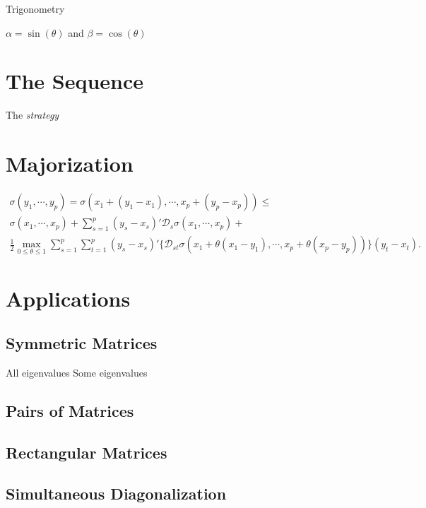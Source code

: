 \documentclass[
  12pt,
]{article}
\begin{document}
Trigonometry

\(\alpha=\sin(\theta)\) and \(\beta=\cos(\theta)\)

\section{The Sequence}\label{the-sequence}

The \emph{strategy}

\section{Majorization}\label{majorization}

\begin{multline}
\sigma(y_1,\cdots,y_p)=\sigma(x_1+(y_1-x_1),\cdots,x_p+(y_p-x_p))\leq\\
\sigma(x_1,\cdots,x_p)+\sum_{s=1}^p(y_s-x_s)'\mathcal{D}_s\sigma(x_1,\cdots,x_p)+\\
\frac12\max_{0\leq\theta\leq 1}\sum_{s=1}^p\sum_{t=1}^p (y_s-x_s)'\{\mathcal{D}_{st}\sigma(x_1+\theta(x_1-y_1),\cdots,x_p+\theta(x_p-y_p))\}(y_t-x_t).
\end{multline}

\section{Applications}\label{applications}

\subsection{Symmetric Matrices}\label{symmetric-matrices}

All eigenvalues
Some eigenvalues

\subsection{Pairs of Matrices}\label{pairs-of-matrices}

\subsection{Rectangular Matrices}\label{rectangular-matrices}

\subsection{Simultaneous Diagonalization}\label{simultaneous-diagonalization}
\end{document}
